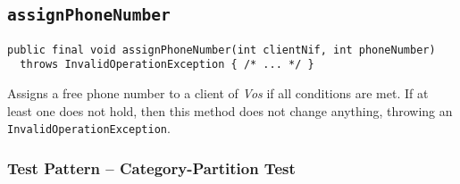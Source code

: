 %
%
%
\subsection{\texttt{assignPhoneNumber}}
\label{sec:methods.assignPhoneNumber}
\begin{verbatim}
public final void assignPhoneNumber(int clientNif, int phoneNumber)
  throws InvalidOperationException { /* ... */ }
\end{verbatim}

Assigns a free phone number to a client of \textit{Vos} if all conditions are
met. If at least one does not hold, then this method does not change anything,
throwing an \texttt{InvalidOperationException}.

\subsubsection{Test Pattern -- Category-Partition Test}
\label{sec:methods.assignPhoneNumber.pattern}

